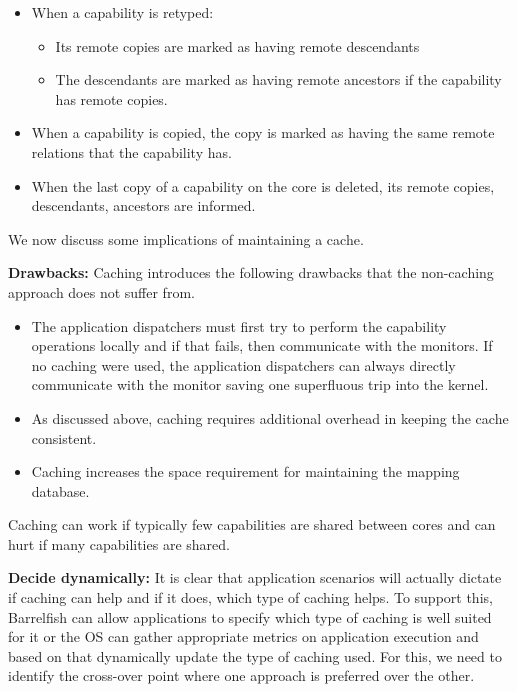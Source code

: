 \documentclass[a4paper,twoside]{report} %
\begin{document}
\begin{itemize}
\item When a capability is retyped:
  \begin{itemize}
  \item Its remote copies are marked as having remote descendants
  \item The descendants are marked as having remote ancestors if the
    capability has remote copies.
  \end{itemize}

\item When a capability is copied, the copy is marked as having the
  same remote relations that the capability has.

\item When the last copy of a capability on the core is deleted, its
  remote copies, descendants, ancestors are informed.
\end{itemize}

We now discuss some implications of maintaining a cache.

\textbf{Drawbacks:} Caching introduces the following drawbacks that
the non-caching approach does not suffer from.

\begin{itemize}
\item The application dispatchers must first try to perform the
  capability operations locally and if that fails, then communicate
  with the monitors. If no caching were used, the application
  dispatchers can always directly communicate with the monitor saving
  one superfluous trip into the kernel.

\item As discussed above, caching requires additional overhead in
  keeping the cache consistent.

\item Caching increases the space requirement for maintaining the
  mapping database.
\end{itemize}

Caching can work if typically few capabilities are shared between
cores and can hurt if many capabilities are shared.

\textbf{Decide dynamically:} It is clear that application scenarios
will actually dictate if caching can help and if it does, which type
of caching helps. To support this, Barrelfish can allow applications
to specify which type of caching is well suited for it or the OS can
gather appropriate metrics on application execution and based on that
dynamically update the type of caching used.  For this, we need to
identify the cross-over point where one approach is preferred over the
other.
\end{document}
